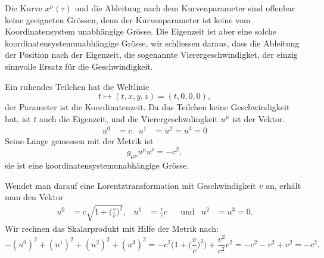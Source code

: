 Die Kurve $x^\mu(\tau)$ und die Ableitung nach dem Kurvenparameter sind
offenbar keine geeigneten Grössen, denn der Kurvenparameter ist
keine vom Koordinatensystem unabhängige Grösse.
Die Eigenzeit ist aber eine solche koordinatensystemunabhängige
Grösse, wir schliessen daraus, dass die Ableitung der Position
nach der Eigenzeit, die sogenannte Vierergeschwindigket, der einzig
sinnvolle Ersatz für die Geschwindigkeit.

Ein ruhendes Teilchen hat die Weltlinie
\[
t\mapsto (t, x, y, z)=(t,0,0,0),
\]
der Parameter ist die Koordinatenzeit.
Da das Teilchen keine Geschwindigkeit hat, ist $t$ auch die Eigenzeit,
und die Vierergeschwdingkeit $u^\mu$ ist der Vektor.
\[
\begin{aligned}
u^0 &= c
&
u^1&=u^2=u^3 = 0
\end{aligned}
\]
Seine Länge gemessen mit der Metrik ist
\[
g_{\mu\nu}u^\mu u^\nu=-c^2,
\]
sie ist eine koordinatensystemunabhängige Grösse.

Wendet man darauf eine Lorentztransformation mit Geschwindigkeit $v$ an,
erhält man den Vektor
\[
\begin{aligned}
u^0
&=
c\sqrt{1+\biggl(\frac{v}{c}\biggr)^2},
&
u^1
&=
\frac{v}{c}c
&&\text{und}
&
u^2&=u^3=0.
\end{aligned}
\]
Wir rechnen das Skalarprodukt mit Hilfe der Metrik nach:
\[
-(u^0)^2 + (u^1)^2 + (u^2)^2 + (u^3)^2
=
-c^2\biggl(1+\biggl(\frac{v}{c}\biggr)^2\biggr) + \frac{v^2}{c^2} c^2
=
-c^2 - v^2  + v^2
= 
-c^2.
\]







